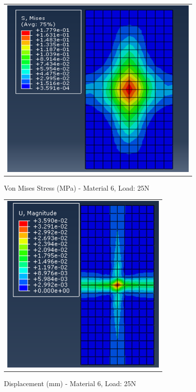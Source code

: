 \documentclass[a4paper,12pt]{article}
\numberwithin{equation}{section}
\numberwithin{figure}{section}
\begin{document}
\begin{figure}[H]
  \centering
  \begin{tabular}{@{}c@{}}
    \includegraphics[width=0.7\linewidth,height=255pt]{Results/Point Loading/M6_VMS_L5_new.png} \\
  \end{tabular}
  \caption{Von Mises Stress (MPa) - Material 6, Load: 25N}
\end{figure}

\begin{figure}[H]
  \centering
  \begin{tabular}{@{}c@{}}
    \includegraphics[width=0.7\linewidth,height=255pt]{Results/Point Loading/M6_DIS_L5_new.png} \\
  \end{tabular}
  \caption{Displacement (mm) - Material 6, Load: 25N}
\end{figure}
\end{document}
